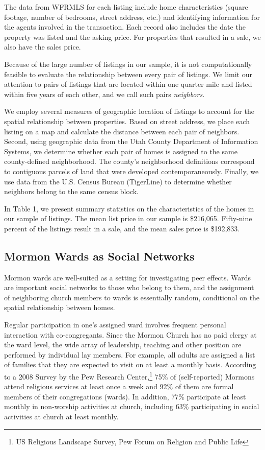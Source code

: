 \documentclass[12pt]{article}
\begin{document}
    The data from WFRMLS for each listing include home characteristics (square footage, number of bedrooms, street address, etc.) and identifying information for the agents involved in the transaction. Each record also includes the date the property was listed and the asking price. For properties that resulted in a sale, we also have the sales price.

    Because of the large number of listings in our sample, it is not computationally feasible to evaluate the relationship between every pair of listings. We limit our attention to pairs of listings that are located within one quarter mile and listed within five years of each other, and we call such pairs \emph{neighbors}.

    We employ several measures of geographic location of listings to account for the spatial relationship between properties.  Based on street address, we place each listing on a map and calculate the distance between each pair of neighbors.  Second, using geographic data from the Utah County Department of Information Systems, we determine whether each pair of homes is assigned to the same county-defined neighborhood. The county's neighborhood definitions correspond to contiguous parcels of land that were developed contemporaneously.  Finally, we use data from the U.S. Census Bureau (TigerLine) to determine whether neighbors belong to the same census block.

    In Table 1, we present summary statistics on the characteristics of the homes in our sample of listings. The mean list price in our sample is \$216,065.  Fifty-nine percent of the listings result in a sale, and the mean sales price is \$192,833.

\subsection*{Mormon Wards as Social Networks}

    Mormon wards are well-suited as a setting for investigating peer effects. Wards are important social networks to those who belong to them, and the assignment of neighboring church members to wards is essentially random, conditional on the spatial relationship between homes.

    Regular participation in one's assigned ward involves frequent personal interaction with co-congregants. Since the Mormon Church has no paid clergy at the ward level, the wide array of leadership, teaching and other position are performed by individual lay members. For example, all adults are assigned a list of families that they are expected to visit on at least a monthly basis. According to a 2008 Survey by the Pew Research Center,\footnote{US Religious Landscape Survey, Pew Forum on Religion  and Public Life} 75\% of (self-reported) Mormons attend religious services at least once a week and 92\% of them are formal members of their congregations (wards). In addition, 77\% participate at least monthly in non-worship activities at church, including  63\% participating in social activities at church at least monthly.  %
\end{document}
